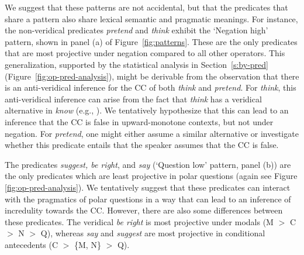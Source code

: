 \documentclass[a4paper,12pt,twoside]{article}
\begin{document}
We suggest that these patterns are not accidental, but that the predicates that share a pattern also share lexical semantic and pragmatic meanings. For instance, the non-veridical predicates \emph{pretend} and \emph{think} exhibit the `Negation high' pattern, shown in panel (a) of Figure~\ref{fig:patterns}. These are the only predicates that are most projective under negation compared to all other operators. This generalization, supported by the statistical analysis in Section~\ref{s:by-pred} (Figure~\ref{fig:op-pred-analysis}), might be derivable from the observation that there is an anti-veridical inference for the CC of both \emph{think} and \emph{pretend}. For \emph{think}, this anti-veridical inference can arise from the fact that \emph{think} has a veridical alternative in \emph{know}  
(e.g., \citealt{heim_artikel_1991,chemla_epistemic_2008}). We tentatively hypothesize that this can lead to an inference that the CC is false in upward-monotone contexts, but not under negation. For \emph{pretend}, one might either assume a similar alternative or investigate whether this predicate entails that the speaker assumes that the CC is false. 


The predicates \emph{suggest, be right}, and \emph{say} (`Question low' pattern, panel (b)) are the only predicates which are least projective in polar questions (again see Figure \ref{fig:op-pred-analysis}). We tentatively suggest that these predicates can interact with the pragmatics of polar questions in a way that can lead to an inference of incredulity towards the CC. However, there are also some differences between these predicates. The veridical \emph{be right} is most projective under modals (M $>$ C $>$ N $>$ Q), whereas \emph{say} and \emph{suggest} are most projective in conditional antecedents (C $>$ \{M,  N\} $>$ Q).
\end{document}
